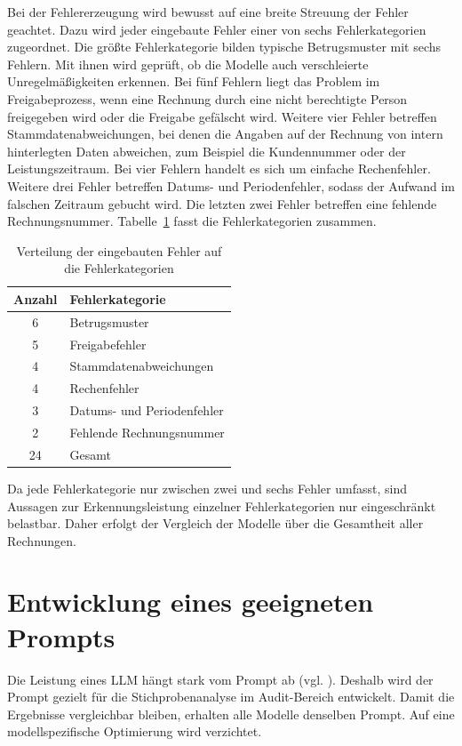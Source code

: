 Bei der Fehlererzeugung wird bewusst auf eine breite Streuung der Fehler geachtet. Dazu wird jeder eingebaute Fehler einer von sechs Fehlerkategorien zugeordnet. Die größte Fehlerkategorie bilden typische Betrugsmuster mit sechs Fehlern. Mit ihnen wird geprüft, ob die Modelle auch verschleierte Unregelmäßigkeiten erkennen. Bei fünf Fehlern liegt das Problem im Freigabeprozess, wenn eine Rechnung durch eine nicht berechtigte Person freigegeben wird oder die Freigabe gefälscht wird. Weitere vier Fehler betreffen Stammdatenabweichungen, bei denen die Angaben auf der Rechnung von intern hinterlegten Daten abweichen, zum Beispiel die Kundennummer oder der Leistungszeitraum. Bei vier Fehlern handelt es sich um einfache Rechenfehler. Weitere drei Fehler betreffen Datums- und Periodenfehler, sodass der Aufwand im falschen Zeitraum gebucht wird. Die letzten zwei Fehler betreffen eine fehlende Rechnungsnummer. Tabelle~\ref{tab:fehlerkategorien} fasst die Fehlerkategorien zusammen.

\begin{table}[htbp]
  \centering
  \begin{tabular}{cl}
    \hline
    Anzahl & Fehlerkategorie\\
    \hline
    6 & Betrugsmuster \\
    5 & Freigabefehler \\
    4 & Stammdatenabweichungen \\
    4 & Rechenfehler \\
    3 & Datums- und Periodenfehler \\
    2 & Fehlende Rechnungsnummer \\
    \hline
    24 & Gesamt \\
    \hline
  \end{tabular}
  \caption{Verteilung der eingebauten Fehler auf die Fehlerkategorien}
  \label{tab:fehlerkategorien}
\end{table}

Da jede Fehlerkategorie nur zwischen zwei und sechs Fehler umfasst, sind Aussagen zur Erkennungsleistung einzelner Fehlerkategorien nur eingeschränkt belastbar. Daher erfolgt der Vergleich der Modelle über die Gesamtheit aller Rechnungen.

\section{Entwicklung eines geeigneten Prompts}
\label{sec:prompt}

Die Leistung eines \ac{LLM} hängt stark vom Prompt ab (vgl. \cite[S.~6\,f.]{sclar2024quantifying}). Deshalb wird der Prompt gezielt für die Stichprobenanalyse im Audit-Bereich entwickelt. Damit die Ergebnisse vergleichbar bleiben, erhalten alle Modelle denselben Prompt. Auf eine modellspezifische Optimierung wird verzichtet.

